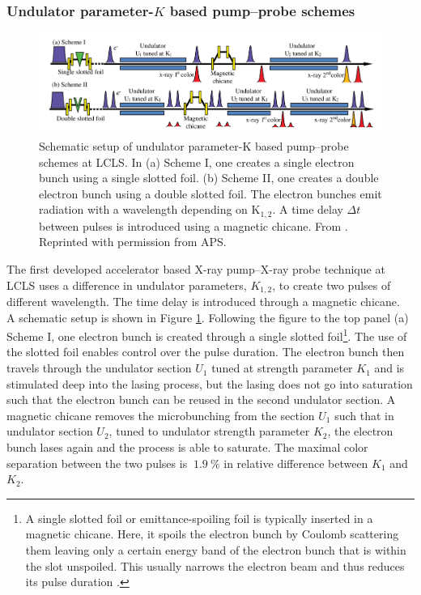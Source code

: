 \subsubsection{Undulator parameter-$K$ based pump--probe schemes}\label{sec:k-based-pump--probe}
%
\begin{figure}
	\centering
		\includegraphics[width=1.00\textwidth]{images/Albertos-pump-probe-scheme.png}
	\caption[Schematic setup of an undulator based pump--probe scheme.]{Schematic setup of undulator parameter-K based pump--probe schemes at LCLS. In (a) Scheme I, one creates a single electron bunch using a single slotted foil. (b) Scheme II, one creates a double electron bunch using a double slotted foil. The electron bunches emit radiation with a wavelength depending on K$_{1,2}$. A time delay $\Delta t$ between pulses is introduced using a magnetic chicane. From \citep{Lutman-2013-PRL}. Reprinted with permission from APS.}
	\label{fig:Albertos-pump-probe-scheme}
\end{figure}
%
The first developed accelerator based X-ray pump--X-ray probe technique at LCLS \citep{Lutman-2013-PRL} uses a difference in undulator parameters, $K_{1,2}$, to create two pulses of different wavelength. The time delay is introduced through a magnetic chicane.\\[1\baselineskip]
%
A schematic setup is shown in Figure \ref{fig:Albertos-pump-probe-scheme}.
Following the figure to the top panel (a) Scheme I, one electron bunch is created through a single slotted foil\footnote{A single slotted foil or emittance-spoiling foil is typically inserted in a magnetic chicane. Here, it spoils the electron bunch by Coulomb scattering them leaving only a certain energy band of the electron bunch that is within the slot unspoiled. This usually narrows the electron beam and thus reduces its pulse duration \citep{Emma-2004-PRL}.}. The use of the slotted foil enables control over the pulse duration. The electron bunch then travels through the undulator section $U_{1}$ tuned at strength parameter $K_{1}$ and is stimulated deep into the lasing process, but the lasing does not go into saturation such that the electron bunch can be reused in the second undulator section. A magnetic chicane removes the microbunching from the section $U_{1}$ such that in undulator section $U_{2}$, tuned to undulator strength parameter $K_{2}$, the electron bunch lases again and the process is able to saturate. The maximal color separation between the two pulses is $~ \SI{1.9}{\percent}$ in relative difference between $K_{1}$ and $K_{2}$.\\[1\baselineskip]
